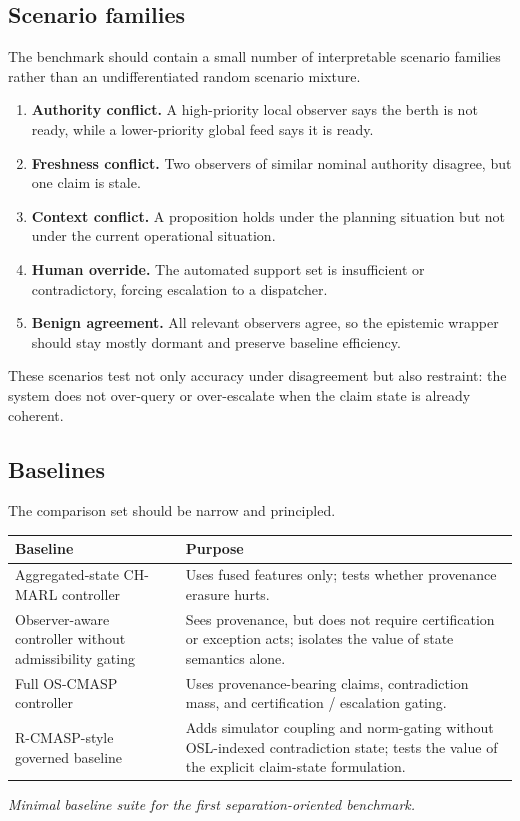 \documentclass[11pt]{article}
\newcommand{\1}{\mathbf{1}}
\theoremstyle{definition}
\theoremstyle{plain}
\theoremstyle{remark}
\begin{document}
\subsection{Scenario families}

The benchmark should contain a small number of interpretable scenario families rather than an undifferentiated random scenario mixture.

\begin{enumerate}[leftmargin=1.7em,label=\textbf{S\arabic*:}]
\item \textbf{Authority conflict.} A high-priority local observer says the berth is not ready, while a lower-priority global feed says it is ready.
\item \textbf{Freshness conflict.} Two observers of similar nominal authority disagree, but one claim is stale.
\item \textbf{Context conflict.} A proposition holds under the planning situation but not under the current operational situation.
\item \textbf{Human override.} The automated support set is insufficient or contradictory, forcing escalation to a dispatcher.
\item \textbf{Benign agreement.} All relevant observers agree, so the epistemic wrapper should stay mostly dormant and preserve baseline efficiency.
\end{enumerate}

These scenarios test not only accuracy under disagreement but also restraint: the system does not over-query or over-escalate when the claim state is already coherent.

\subsection{Baselines}

The comparison set should be narrow and principled.

\begin{center}
\small
\begin{tabularx}{\textwidth}{>{\raggedright\arraybackslash}p{}X}
\toprule
\textbf{Baseline} & \textbf{Purpose} \\
\midrule
Aggregated-state CH-MARL controller & Uses fused features only; tests whether provenance erasure hurts. \\
Observer-aware controller without admissibility gating & Sees provenance, but does not require certification or exception acts; isolates the value of state semantics alone. \\
Full OS-CMASP controller & Uses provenance-bearing claims, contradiction mass, and certification / escalation gating. \\
R-CMASP-style governed baseline & Adds simulator coupling and norm-gating without OSL-indexed contradiction state; tests the value of the explicit claim-state formulation. \\
\bottomrule
\end{tabularx}
\par\vspace{0.25em}
{\small\emph{Minimal baseline suite for the first separation-oriented benchmark.}}
\end{center}
\end{document}
